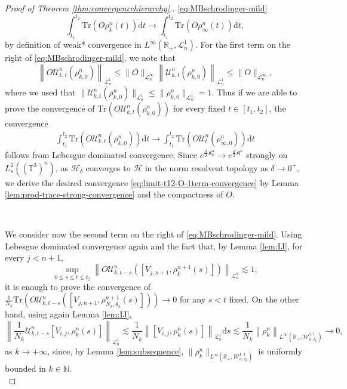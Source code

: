 \begin{proof}[Proof of Theorem \ref{thm:convergencehierarchy}.]
  \eqref{eq:MBschrodinger-mild}
  \[ \int_{t_1}^{t_2} \mathrm{Tr} \left(O \rho^n_k (t)\right) \mathrm{d} t \rightarrow
     \int_{t_1}^{t_2} \mathrm{Tr} \left(O \rho^n_{\infty} (t)\right) \mathrm{d} t, \]
  by definition of weak* convergence in $L^{\infty} (\mathbb{R}_+,
  \mathcal{L}^1_n)$. For the first term on the right of
  \eqref{eq:MBschrodinger-mild}, we note that
  \[ \left\| O  \mathcal{U}^n_{k, t} (\rho^n_{k, 0}) \right\|_{\mathcal{L}^1_n}
     \leqslant \| O \|_{\mathcal{L}_n^{\infty}} \left\| \mathcal{U}^n_{k, t}
     (\rho^n_{k, 0}) \right\|_{\mathcal{L}_n^1} \leqslant \| O
     \|_{\mathcal{L}^{\infty}_n}, \]
  where we used that $\| \mathcal{U}^n_{k, t} (\rho^n_{k, 0})
  \|_{\mathcal{L}_n^1} \leq \| \rho^n_{k, 0} \|_{\mathcal{L}_n^1} = 1$. Thus if we are able to prove the convergence
  of $\mathrm{Tr} (O  \mathcal{U}^n_{k, t} (\rho^n_{k, 0}))$ for every
  fixed $t \in [t_1, t_2]$, the convergence
  \begin{align}
    \int_{t_1}^{t_2} \mathrm{Tr} \left(O \mathcal{U}^n_{k, t} (\rho^n_{k,
    0})\right) \mathrm{d} t \rightarrow \int_{t_1}^{t_2} \mathrm{Tr} \left(O
    \mathcal{U}^n_t (\rho^n_{\infty, 0})\right) \mathrm{d} t
    \label{eq:limit-t12-O-1term-convergence}
  \end{align}
  follows from Lebesgue dominated convergence. Since $e^{ \frac{i t }{2}\mathfrak{K}_{\delta}^n }
    \rightarrow e^{\frac{i t}{2}\mathfrak{K}^n} $
  strongly on $L^2_s ((\mathbb{T}^3)^n)$, as $\mathcal{H}_{\delta}$ converges
  to $\mathcal{H}$ in the norm resolvent topology as $\delta \rightarrow 0^+$,
  we derive the desired convergence \eqref{eq:limit-t12-O-1term-convergence}
  by Lemma \ref{lem:prod-trace-strong-convergence} and the compactness of
  $O$.
  
  \
  
  We consider now the second term on the right of
  \eqref{eq:MBschrodinger-mild}. Using Lebesgue dominated convergence again
  and the fact that, by Lemma \ref{lem:IJ}, for every $j < n + 1$,
  \[ \sup_{0 \leqslant s \leqslant t \leqslant t_2} \left\| O
     \mathcal{U}^n_{k, t - s} \left([V_{j, n + 1}, \rho^{n + 1}_k (s)]\right)
    \right \|_{\mathcal{L}^1_n} \lesssim 1, \]
  it is enough to prove the convergence of $\frac{1}{N_k} \mathrm{Tr} (O
  \mathcal{U}^n_{k, t - s} ([V_{j, n + 1}, \rho^{n + 1}_{N_k, \delta_k} (s)]))
  \rightarrow 0$ for any $s < t$ fixed. On the other hand, using again Lemma
  \ref{lem:IJ},
  \[ \left\| \frac{1}{N_k} \mathcal{U}^n_{k, t - s} [V_{i, j},
     \rho^n_k (s)] \right\|_{\mathcal{L}_n^1} \lesssim \frac{1}{N_k} \left\| [V_{i,
     j}, \rho^n_k (s)] \right\|_{\mathcal{L}_n^1} \mathrm{d} s \lesssim \frac{1}{N_k} \left\|
     \rho^n_k \right\|_{L^{\infty} (\mathbb{R}_+, \mathcal{W}_{n, \delta_k}^{1, 1})}
     \rightarrow 0, \]
  as $k \rightarrow + \infty$, since, by Lemma \ref{lem:subsequence}, $\|
  \rho^n_k \|_{L^{\infty} (\mathbb{R}_+, \mathcal{W}_{n, \delta_k}^{1, 1})}$
  is uniformly bounded in $k \in \mathbb{N}$.\\
  

\end{proof}
